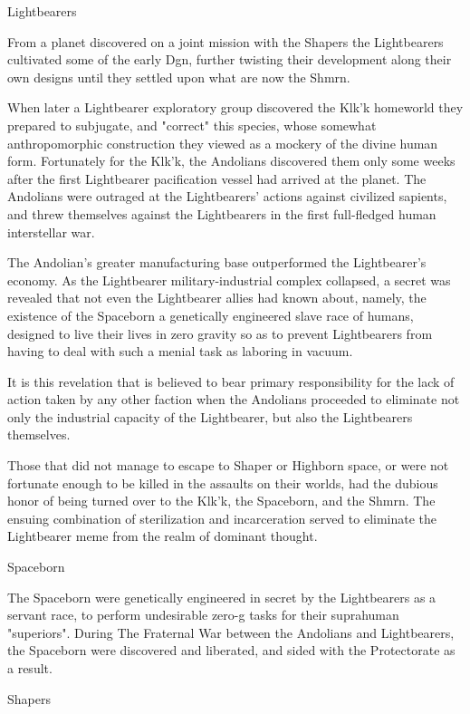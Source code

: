 Lightbearers

From a planet discovered on a joint mission with the Shapers the
Lightbearers cultivated some of the early Dgn, further twisting their
development along their own designs until they settled upon what are
now the Shmrn.

When later a Lightbearer exploratory group discovered the Klk'k
homeworld they prepared to subjugate, and "correct" this species,
whose somewhat anthropomorphic construction they viewed as a mockery
of the divine human form. Fortunately for the Klk'k, the Andolians
discovered them only some weeks after the first Lightbearer
pacification vessel had arrived at the planet. The Andolians were
outraged at the Lightbearers' actions against civilized sapients, and
threw themselves against the Lightbearers in the first full-fledged
human interstellar war.

The Andolian's greater manufacturing base outperformed the
Lightbearer's economy. As the Lightbearer military-industrial complex
collapsed, a secret was revealed that not even the Lightbearer allies
had known about, namely, the existence of the Spaceborn a genetically
engineered slave race of humans, designed to live their lives in zero
gravity so as to prevent Lightbearers from having to deal with such a
menial task as laboring in vacuum.

It is this revelation that is believed to bear primary responsibility
for the lack of action taken by any other faction when the Andolians
proceeded to eliminate not only the industrial capacity of the
Lightbearer, but also the Lightbearers themselves.

Those that did not manage to escape to Shaper or Highborn space, or
were not fortunate enough to be killed in the assaults on their
worlds, had the dubious honor of being turned over to the Klk'k, the
Spaceborn, and the Shmrn.  The ensuing combination of sterilization
and incarceration served to eliminate the Lightbearer meme from the
realm of dominant thought.

Spaceborn

The Spaceborn were genetically engineered in secret by the
Lightbearers as a servant race, to perform undesirable zero-g tasks
for their suprahuman "superiors". During The Fraternal War between the
Andolians and Lightbearers, the Spaceborn were discovered and
liberated, and sided with the Protectorate as a result.

Shapers

